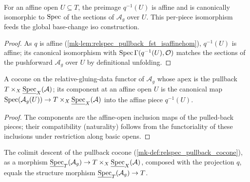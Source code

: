 \begin{definition}
  \label{mk-def:relspec_pullback_iso_affine_piece}

  For an affine open \(U \subseteq T\), the preimage \(q^{-1}(U)\) is affine and is
  canonically isomorphic to \(\operatorname{Spec}\) of the sections of \(\mathcal{A}_g\) over \(U\).
  This per-piece isomorphism feeds the global base-change
  iso construction.
\end{definition}

\begin{proof}
  As \(q\) is affine (\ref{mk-lem:relspec_pullback_fst_isaffinehom}), \(q^{-1}(U)\) is
  affine; its canonical isomorphism with \(\operatorname{Spec} \Gamma(q^{-1}(U), \mathcal{O})\) matches
  the sections of the pushforward \(\mathcal{A}_g\) over \(U\) by definitional
  unfolding.
\end{proof}

\begin{definition}
  \label{mk-def:relspec_pullback_cocone}

  A cocone on the relative-gluing-data functor of \(\mathcal{A}_g\) whose apex is the
  pullback \(T \times_X \underline{\operatorname{Spec}}_X(\mathcal{A})\); its component at an affine
  open \(U\) is the canonical map \(\operatorname{Spec}(\mathcal{A}_g(U)) \to
  T \times_X \underline{\operatorname{Spec}}_X(\mathcal{A})\) into the affine piece \(q^{-1}(U)\).
\end{definition}

\begin{proof}
  The components are the affine-open inclusion maps of the pulled-back pieces; their
  compatibility (naturality) follows from the functoriality of these inclusions under
  restriction along basic opens.
\end{proof}

\begin{lemma}
  \label{mk-lem:relspec_pullback_cocone_desc_comp_fst}

  The colimit descent of the pullback cocone
  (\ref{mk-def:relspec_pullback_cocone}), as a morphism
  \(\underline{\operatorname{Spec}}_T(\mathcal{A}_g) \to
    T \times_X \underline{\operatorname{Spec}}_X(\mathcal{A})\),
  composed with the projection \(q\), equals the structure morphism
  \(\underline{\operatorname{Spec}}_T(\mathcal{A}_g) \to T\).
\end{lemma}


